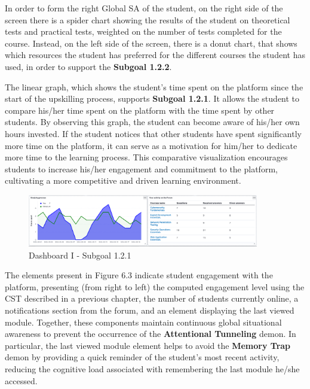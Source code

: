 In order to form the right Global SA of the student, on 
the right side of the screen there is a spider chart showing the results of the student on theoretical tests and
practical tests, weighted on the number of tests completed for the course.
Instead, on the left side of the screen, there is a
donut chart, that shows which resources the student has preferred for the different courses 
the student has used, in order to support the \textbf{Subgoal 1.2.2}.

The linear graph, which shows the student's time spent on the platform since the start of the upskilling process, supports \textbf{Subgoal 1.2.1}. 
It allows the student to compare his/her time spent on the platform with the time spent by other students. 
By observing this graph, the student can become aware of his/her own hours invested. 
If the student notices that other students have spent significantly more time on the platform, it can serve as a motivation for him/her to dedicate more time to the learning process. 
This comparative visualization encourages students to increase his/her engagement and commitment to the platform, cultivating a more competitive and driven learning environment.


\begin{figure}[H]
    \centering
    \includegraphics[width=0.9\textwidth]{assets/dashboard_1_121.png}
    \caption{Dashboard I - Subgoal 1.2.1}
    \label{fig:dashboard_1_subgoal_121}
\end{figure}

The elements present in Figure 6.3 indicate student engagement with the platform, presenting (from right to left) the computed engagement level using the CST described in a previous chapter, the number of students currently online, a notifications section from the forum, and an element displaying the last viewed module. Together, these components maintain continuous global situational awareness to prevent the occurrence of the \textbf{Attentional Tunneling} demon.
In particular, the last viewed module element helps to avoid the \textbf{Memory Trap} demon by providing a quick reminder of the student's most recent activity, reducing the cognitive load associated with remembering the last module he/she accessed.

